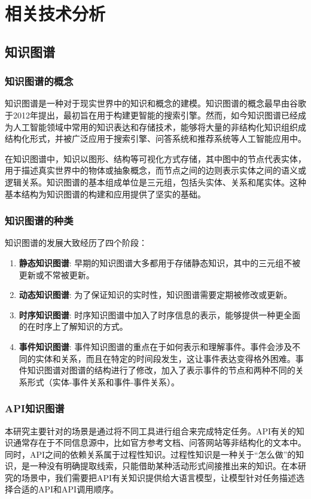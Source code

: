 
\chapter{相关技术分析}

\section{知识图谱}

\subsection{知识图谱的概念}
知识图谱是一种对于现实世界中的知识和概念的建模。知识图谱的概念最早由谷歌于2012年提出，最初旨在用于构建更智能的搜索引擎。然而，如今知识图谱已经成为人工智能领域中常用的知识表达和存储技术，能够将大量的非结构化知识组织成结构化形式，并被广泛应用于搜索引擎、问答系统和推荐系统等人工智能应用中。

在知识图谱中，知识以图形、结构等可视化方式存储，其中图中的节点代表实体，用于描述真实世界中的物体或抽象概念，而节点之间的边则表示实体之间的语义或逻辑关系。知识图谱的基本组成单位是三元组，包括头实体、关系和尾实体。这种基本结构为知识图谱的构建和应用提供了坚实的基础。

\subsection{知识图谱的种类}
知识图谱的发展大致经历了四个阶段\cite{Jiang2023}：

\begin{enumerate}
  \item \textbf{静态知识图谱}: 早期的知识图谱大多都用于存储静态知识，其中的三元组不被更新或不常被更新。
  \item \textbf{动态知识图谱}: 为了保证知识的实时性，知识图谱需要定期被修改或更新。
  \item \textbf{时序知识图谱}: 时序知识图谱中加入了时序信息的表示，能够提供一种更全面的在时序上了解知识的方式。
  \item \textbf{事件知识图谱}: 事件知识图谱的重点在于如何表示和理解事件。事件会涉及不同的实体和关系，而且在特定的时间段发生，这让事件表达变得格外困难。事件知识图谱对图谱的结构进行了修改，加入了表示事件的节点和两种不同的关系形式（实体-事件关系和事件-事件关系）。
\end{enumerate}

\subsection{API知识图谱}
本研究主要针对的场景是通过将不同工具进行组合来完成特定任务。API有关的知识通常存在于不同信息源中，比如官方参考文档、问答网站等非结构化的文本中\cite{马展}。同时，API之间的依赖关系属于过程性知识。过程性知识是一种关于“怎么做”的知识，是一种没有明确提取线索，只能借助某种活动形式间接推出来的知识。在本研究的场景中，我们需要把API有关知识提供给大语言模型，让模型针对任务描述选择合适的API和API调用顺序。

